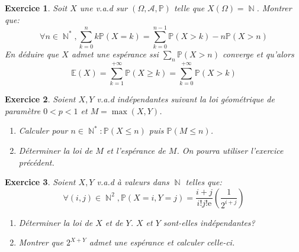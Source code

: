 \documentclass[12pt,a4paper,landscape]{article}
\DeclareMathOperator{\N}{\mathbb{N}}
\newtheorem{Exo}{Exercice}
\newcommand{\tribu}{\mathcal{A}}
\renewcommand{\Pr}{\mathbb{P}}
\begin{document}
\begin{Exo}
		Soit $X$ une v.a.d sur 	$\left(\Omega,\tribu,\Pr\right)$ telle que $X(\Omega)=\N$.
Montrer que: $$\forall n\in\N^*,\sum_{k=0}^nk\Pr(X=k)=\sum_{k=0}^{n-1}\Pr(X>k)-n\Pr(X>n)$$
 En déduire que  $X$ admet une espérance ssi $\sum_n\Pr(X>n)$ converge et qu'alors $$\mathbb{E}(X)=\sum_{k=1}^{+\infty}\Pr(X\geqslant k)=\sum_{k=0}^{+\infty}\Pr(X>k)$$
\end{Exo}

\begin{Exo}
	Soient $X,Y$ v.a.d indépendantes suivant la loi géométrique de paramètre $0<p<1$ et $M=\max(X,Y)$.
\begin{enumerate}
	\item
	Calculer pour $n\in\N^*:\Pr(X\leqslant n)$ puis $\Pr(M\leqslant n)$.
	\item
	Déterminer la loi de $M$ et l'espérance de $M$. On pourra utiliser l'exercice précédent.
\end{enumerate}
\end{Exo}






\begin{Exo}
	Soient $X,Y$ v.a.d à valeurs dans $\N$ telles que:
$$\forall(i,j)\in\N^2,\Pr(X=i,Y=j)=\frac{i+j}{i!j!\mathrm{e}}\left(\frac{1}{2^{i+j}}\right)$$
\begin{enumerate}
	\item
	Déterminer la loi de $X$ et de $Y$. $X$ et $Y$ sont-elles indépendantes?
	\item
	Montrer que $2^{X+Y}$ admet une espérance et calculer celle-ci.
\end{enumerate}
\end{Exo}
\end{document}
